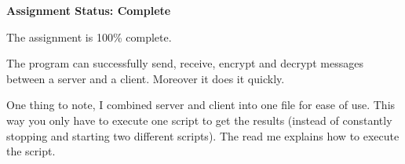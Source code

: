 \documentclass[11pt]{memo}
\begin{document}
\USM

\Date{\today}

\begin{memo}

\textbf{Assignment Status: Complete}

The assignment is 100\% complete.

The program can successfully send, receive, encrypt and decrypt messages between a server and a client.  Moreover it does it quickly.

One thing to note, I combined server and client into one file for ease of use.  This way you only have to execute one script to get the results (instead of constantly stopping and starting two different scripts).  The read me explains how to execute the script.

\end{memo}
\end{document}
